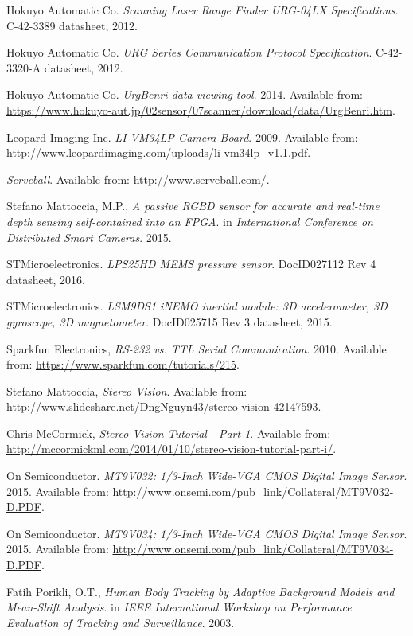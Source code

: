 \begin{thebibliography}{9}
Hokuyo Automatic Co. \textit{Scanning Laser Range Finder URG-04LX Specifications}. C-42-3389 datasheet, 2012.

Hokuyo Automatic Co. \textit{URG Series Communication Protocol Specification}. C-42-3320-A datasheet, 2012.

Hokuyo Automatic Co. \textit{UrgBenri data viewing tool}. 2014. Available from: \url{https://www.hokuyo-aut.jp/02sensor/07scanner/download/data/UrgBenri.htm}.

Leopard Imaging Inc.
\textit{LI-VM34LP Camera Board}. 2009.
Available from: \url{http://www.leopardimaging.com/uploads/li-vm34lp_v1.1.pdf}.

\textit{Serveball}.
Available from: \url{http://www.serveball.com/}.

Stefano Mattoccia, M.P.,
\textit{A passive RGBD sensor for accurate and real-time depth sensing self-contained into an FPGA}.
in \textit{International Conference on Distributed Smart Cameras}. 2015.

STMicroelectronics. \textit{LPS25HD MEMS pressure sensor}. DocID027112 Rev 4 datasheet, 2016.

STMicroelectronics. \textit{LSM9DS1 iNEMO inertial module: 3D accelerometer, 3D gyroscope, 3D magnetometer}. DocID025715 Rev 3 datasheet, 2015.

Sparkfun Electronics, \textit{RS-232 vs. TTL Serial Communication}. 2010. Available from: \url{https://www.sparkfun.com/tutorials/215}.

Stefano Mattoccia, \textit{Stereo Vision}. Available from: \url{http://www.slideshare.net/DngNguyn43/stereo-vision-42147593}.

Chris McCormick, \textit{Stereo Vision Tutorial  - Part 1}. Available from: \url{http://mccormickml.com/2014/01/10/stereo-vision-tutorial-part-i/}.

On Semiconductor. 
\textit{MT9V032: 1/3-Inch Wide-VGA CMOS Digital Image Sensor}. 2015. 
Available from: \url{http://www.onsemi.com/pub_link/Collateral/MT9V032-D.PDF}.

On Semiconductor. 
\textit{MT9V034: 1/3-Inch Wide-VGA CMOS Digital Image Sensor}. 2015. 
Available from: \url{http://www.onsemi.com/pub_link/Collateral/MT9V034-D.PDF}.

Fatih Porikli, O.T.,
\textit{Human Body Tracking by Adaptive Background Models and Mean-Shift Analysis}.
in \textit{IEEE International Workshop on Performance Evaluation of Tracking and Surveillance}. 2003.


\end{thebibliography}
